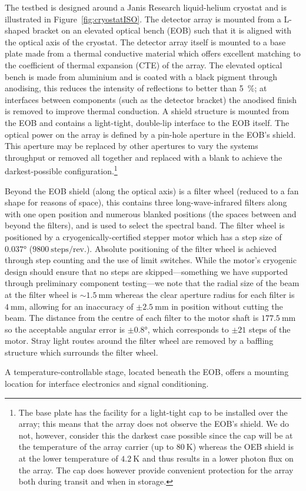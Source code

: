 \documentclass{spie}
\begin{document}
The testbed is designed around a Janis Research liquid-helium cryostat and is illustrated in Figure~\ref{fig:cryostatISO}. The detector array is mounted from a L-shaped bracket on an elevated optical bench (EOB) such that it is aligned with the optical axis of the cryostat. The detector array itself is mounted to a base plate made from a thermal conductive material which offers excellent matching to the coefficient of thermal expansion (CTE) of the array. The elevated optical bench is made from aluminium and is coated with a black pigment through anodising, this reduces the intensity of reflections to better than 5~\%; at interfaces between components (such as the detector bracket) the anodised finish is removed to improve thermal conduction. A shield structure is mounted from the EOB and contains a light-tight, double-lip interface to the EOB itself. The optical power on the array is defined by a pin-hole aperture in the EOB's shield. This aperture may be replaced by other apertures to vary the systems throughput or removed all together and replaced with a blank to achieve the darkest-possible configuration.\footnote{The base plate has the facility for a light-tight cap to be installed over the array; this means that the array does not observe the EOB's shield. We do not, however, consider this the darkest case possible since the cap will be at the temperature of the array carrier (up to $80~\si{\kelvin}$) whereas the OEB shield is at the lower temperature of $4.2~\si{\kelvin}$ and thus results in a lower photon flux on the array. The cap does however provide convenient protection for the array both during transit and when in storage.}
\par 
Beyond the EOB shield (along the optical axis) is a filter wheel (reduced to a fan shape for reasons of space), this contains three long-wave-infrared filters along with one open position and numerous blanked positions (the spaces between and beyond the filters), and is used to select the spectral band. The filter wheel is positioned by a cryogenically-certified stepper motor which has a step size of $0.037\si{\degree}$ ($9800~\mathrm{steps/rev.}$). Absolute positioning of the filter wheel is achieved through step counting and the use of limit switches. While the motor's cryogenic design should ensure that no steps are skipped---something we have supported through preliminary component testing---we note that the radial size of the beam at the filter wheel is $\sim 1.5~\si{\milli\metre}$ whereas the clear aperture radius for each filter is $4~\si{\milli\metre}$, allowing for an inaccuracy of $\pm 2.5~\si{\milli\metre}$ in position without cutting the beam. The distance from the centre of each filter to the motor shaft is $177.5~\si{\milli\metre}$ so the acceptable angular error is $\pm 0.8\si{\degree}$, which corresponds to $\pm 21$ steps of the motor. Stray light routes around the filter wheel are removed by a baffling structure which surrounds the filter wheel.
\par 
A temperature-controllable stage, located beneath the EOB, offers a mounting location for interface electronics and signal conditioning.
%
\end{document}
